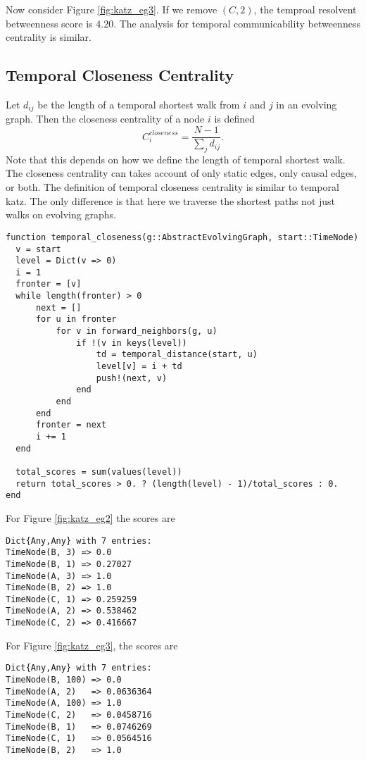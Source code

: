 \documentclass[12pt]{article}
\theoremstyle{definition}
\begin{document}
Now consider Figure \ref{fig:katz_eg3}. If we remove $(C,2)$, the temproal resolvent betweenness score is $4.20$.
The analysis for temporal communicability betweenness centrality is similar.

\subsection{Temporal Closeness Centrality}
\label{sec:temp-betw-centr}

Let $d_{ij}$ be the length of a temporal shortest walk from $i$ and $j$ in an evolving graph. Then
the closeness centrality of a node $i$ is defined
$$
C_i^{closeness} = \frac{N-1}{\sum_j d_{ij}}.
$$
Note that this depends on how we define the length of temporal shortest walk. The closeness centrality can takes account of only static edges, only causal edges, or both.
The definition of temporal closeness centrality is similar to temporal katz. The only difference is that here we traverse the shortest paths not just walks on evolving graphs.

\begin{lstlisting}
function temporal_closeness(g::AbstractEvolvingGraph, start::TimeNode)
  v = start
  level = Dict(v => 0)
  i = 1
  fronter = [v]
  while length(fronter) > 0
      next = []
      for u in fronter
          for v in forward_neighbors(g, u)
              if !(v in keys(level))
                  td = temporal_distance(start, u)
                  level[v] = i + td
                  push!(next, v)
              end
          end
      end
      fronter = next
      i += 1
  end

  total_scores = sum(values(level))
  return total_scores > 0. ? (length(level) - 1)/total_scores : 0.
end
\end{lstlisting}
For Figure \ref{fig:katz_eg2} the scores are
\begin{lstlisting}
Dict{Any,Any} with 7 entries:
TimeNode(B, 3) => 0.0
TimeNode(B, 1) => 0.27027
TimeNode(A, 3) => 1.0
TimeNode(B, 2) => 1.0
TimeNode(C, 1) => 0.259259
TimeNode(A, 2) => 0.538462
TimeNode(C, 2) => 0.416667
\end{lstlisting}
For Figure \ref{fig:katz_eg3}, the scores are
\begin{lstlisting}
Dict{Any,Any} with 7 entries:
TimeNode(B, 100) => 0.0
TimeNode(A, 2)   => 0.0636364
TimeNode(A, 100) => 1.0
TimeNode(C, 2)   => 0.0458716
TimeNode(B, 1)   => 0.0746269
TimeNode(C, 1)   => 0.0564516
TimeNode(B, 2)   => 1.0
\end{lstlisting}
\end{document}
